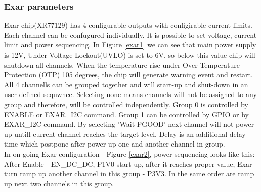 \subsubsection{Exar parameters}

Exar chip(XR77129) has 4 configurable outputs with configirable current limits. Each channel can be confugured individually. It is possible to set voltage, current limit and power sequencing. In Figure \ref{exar1} we can see that main power supply is 12V, Under Voltage Lockout(UVLO) is set to 6V, so below this value chip will shutdown all channels. When the temperature rise under Over Temperature Protection (OTP) 105 degrees, the chip will generate warning event and restart. \\
All 4 channells can be grouped together and will start-up and shut-down in an user defined sequwnce. Selecting none means channels will not be assigned to any group and therefore, will be controlled independently. Group 0 is controlled by ENABLE or EXAR\_I2C command. Group 1 can be controlled by GPIO or by EXAR\_I2C command. By selecting 'Wait PGOOD' next channel will not power up untill current channel reaches the target level. Delay is an additional delay time which postpone after power up one and another channel in group.\\
In on-going Exar configuration - Figure \ref{exar2}, power sequencing looks like this: After Enable - EN\_DC\_DC, P1V0 start-up, after it reaches proper value, Exar turn ramp up another channel in this group - P3V3. In the same order are ramp up next two channels in this group.



